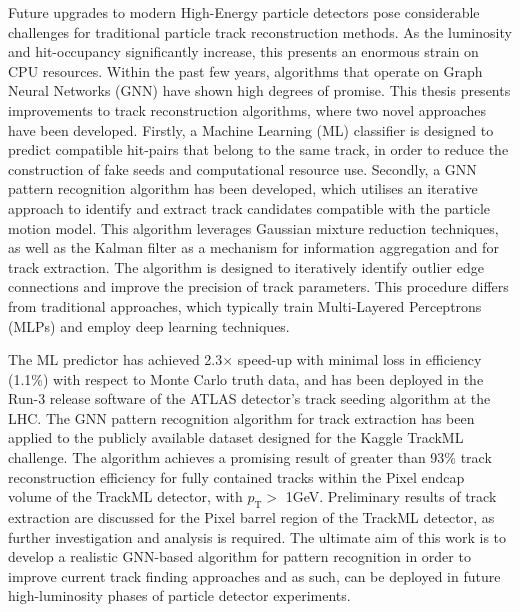 Future upgrades to modern High-Energy particle detectors pose considerable challenges for traditional particle track reconstruction methods. As the luminosity and hit-occupancy significantly increase, this presents an enormous strain on CPU resources. Within the past few years, algorithms that operate on Graph Neural Networks (GNN) have shown high degrees of promise. This thesis presents improvements to track reconstruction algorithms, where two novel approaches have been developed. Firstly, a Machine Learning (ML) classifier is designed to predict compatible hit-pairs that belong to the same track, in order to reduce the construction of fake seeds and computational resource use. Secondly, a GNN pattern recognition algorithm has been developed, which utilises an iterative approach to identify and extract track candidates compatible with the particle motion model. This algorithm leverages Gaussian mixture reduction techniques, as well as the Kalman filter as a mechanism for information aggregation and for track extraction. The algorithm is designed to iteratively identify outlier edge connections and improve the precision of track parameters. This procedure differs from traditional approaches, which typically train Multi-Layered Perceptrons (MLPs) and employ deep learning techniques. 

The ML predictor has achieved 2.3$\times$ speed-up with minimal loss in efficiency (1.1\%) with respect to Monte Carlo truth data, and has been deployed in the Run-3 release software of the ATLAS detector’s track seeding algorithm at the LHC. The GNN pattern recognition algorithm for track extraction has been applied to the publicly available dataset designed for the Kaggle TrackML challenge. The algorithm achieves a promising result of greater than 93\% track reconstruction efficiency for fully contained tracks within the Pixel endcap volume of the TrackML detector, with $p_{\text{T}} >$ 1GeV. Preliminary results of track extraction are discussed for the Pixel barrel region of the TrackML detector, as further investigation and analysis is required. The ultimate aim of this work is to develop a realistic GNN-based algorithm for pattern recognition in order to improve current track finding approaches and as such, can be deployed in future high-luminosity phases of particle detector experiments.

